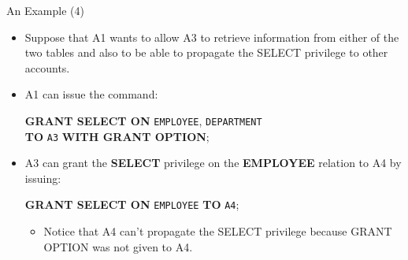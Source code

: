
\begin{frame}{An Example (4)}
    \large %
    
    \begin{itemize}
        \vspace{-0.5cm} %
        
        \item Suppose that A1 wants to allow A3 to retrieve information from either of the two tables and also to be able to propagate the SELECT privilege to other accounts.
        
        \item A1 can issue the command:
        
        \vspace{0.2cm}
        {
            \normalsize \color{red!70!black}
            \textbf{GRANT SELECT ON} \texttt{EMPLOYEE}, \texttt{DEPARTMENT} \\[0.1cm]
            \hspace{1.5cm} \textbf{TO} \texttt{A3} \textbf{WITH GRANT OPTION};
        }
        \vspace{0.2cm}
        
        \item A3 can grant the \textbf{SELECT} privilege on the \textbf{EMPLOYEE} relation to A4 by issuing:
        
        \vspace{0.2cm}
        {
            \normalsize \color{red!70!black}
            \textbf{GRANT SELECT ON} \texttt{EMPLOYEE} \textbf{TO} \texttt{A4};
        }
        
        \begin{itemize}
            \large
            \item Notice that A4 can't propagate the SELECT privilege because GRANT OPTION was not given to A4.
        \end{itemize}
        
    \end{itemize}
\end{frame}


